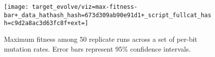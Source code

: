 \begin{figure*}
\begin{center}

\texttt{[image: target\_evolve/viz=max-fitness-bar+\_data\_hathash\_hash=673d309ab90e91d1+\_script\_fullcat\_hash=c9d2a8ac3d63fc8f+ext=]}
\caption{
Maximum fitness among 50 replicate runs across a set of per-bit mutation rates.
Error bars represent 95\% confidence intervals.
}
\label{fig:evolve_mutsweep}

\end{center}
\end{figure*}
